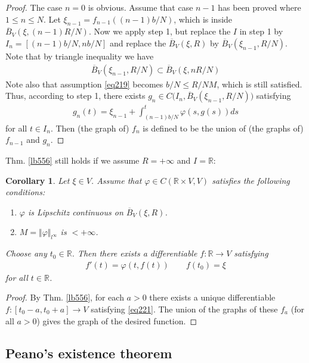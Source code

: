 \documentclass[12pt,b5paper,notitlepage]{article}
\theoremstyle{definition}
\theoremstyle{plain}
\newtheorem{co}[df]{Corollary}
\newcommand{\ovl}{\overline}
\newcommand{\Rbb}{\mathbb R}
\newcommand{\dps}{\displaystyle}
\numberwithin{equation}{section}
\begin{document}
\begin{proof}
The case $n=0$ is obvious. Assume that case $n-1$ has been proved where $1\leq n\leq N$. Let $\xi_{n-1}=f_{n-1}((n-1)b/N)$, which is inside $\ovl B_V(\xi,(n-1)R/N)$. Now we apply step 1, but replace the $I$ in step 1 by $I_n=[(n-1)b/N,nb/N]$ and replace the $\ovl B_V(\xi,R)$ by $\ovl B_V(\xi_{n-1},R/N)$. Note that by triangle inequality we have
\begin{align*}
\ovl B_V(\xi_{n-1},R/N)\subset \ovl B_V(\xi,nR/N)
\end{align*}
Note also that assumption \eqref{eq219} becomes $b/N\leq R/NM$, which is still satisfied. Thus, according to step 1, there exists $\dps g_n\in C\big(I_n,\ovl B_V(\xi_{n-1},R/N)\big)$ satisfying
\begin{align*}
g_n(t)=\xi_{n-1}+\int_{(n-1)b/N}^t \varphi(s,g(s))ds
\end{align*}
for all $t\in I_n$. Then (the graph of) $f_n$ is defined to be the union of (the graphs of) $f_{n-1}$ and $g_n$.
\end{proof}


Thm. \ref{lb556} still holds if we assume $R=+\infty$ and $I=\Rbb$:

\begin{co}\label{lb558}
Let $\xi\in V$. Assume that $\varphi\in C(\Rbb\times V,V)$ satisfies the following conditions:
\begin{enumerate}[label=(\arabic*)]
\item $\varphi$ is Lipschitz continuous on $\ovl B_V(\xi,R)$.
\item $M=\Vert\varphi\Vert_{l^\infty}$ is $<+\infty$.
\end{enumerate}
Choose any $t_0\in\Rbb$. Then there exists a differentiable $f:\Rbb\rightarrow V$ satisfying
\begin{align}
f'(t)=\varphi(t,f(t))\qquad f(t_0)=\xi \label{eq221}
\end{align}
for all $t\in\Rbb$.
\end{co}

\begin{proof}
By Thm. \ref{lb556}, for each $a>0$ there exists a unique differentiable $f:[t_0-a,t_0+a]\rightarrow V$ satisfying \eqref{eq221}. The union of the graphs of these $f_a$ (for all $a>0$) gives the graph of the desired function.
\end{proof}






\subsection{Peano's existence theorem}
\end{document}
